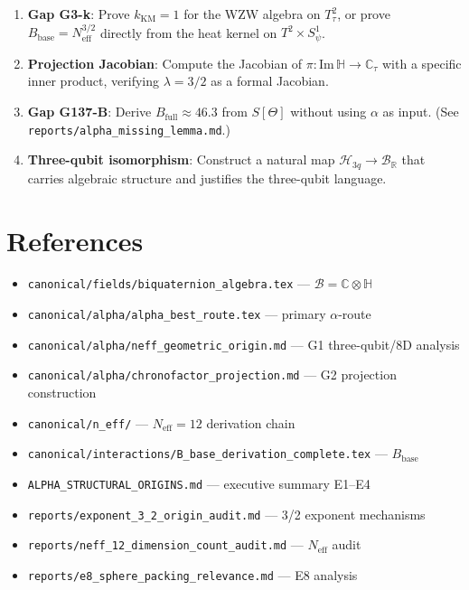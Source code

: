 \documentclass[12pt,a4paper]{article}
\theoremstyle{definition}
\theoremstyle{remark}
\begin{document}
\begin{enumerate}
  \item \textbf{Gap G3-k}: Prove $k_\mathrm{KM} = 1$ for the WZW algebra on $T^2_\tau$,
        or prove $B_\mathrm{base} = N_\mathrm{eff}^{3/2}$ directly from the heat kernel
        on $T^2 \times S^1_\psi$.

  \item \textbf{Projection Jacobian}: Compute the Jacobian of
        $\pi: \mathrm{Im}\,\mathbb{H} \to \mathbb{C}_\tau$ with a specific inner product,
        verifying $\lambda = 3/2$ as a formal Jacobian.

  \item \textbf{Gap G137-B}: Derive $B_\mathrm{full} \approx 46.3$ from $S[\Theta]$
        without using $\alpha$ as input.  (See \texttt{reports/alpha\_missing\_lemma.md}.)

  \item \textbf{Three-qubit isomorphism}: Construct a natural map
        $\mathcal{H}_{3q} \to \mathcal{B}_\mathbb{R}$ that carries algebraic structure
        and justifies the three-qubit language.
\end{enumerate}

\section{References}
\label{sec:g5:refs}

\begin{itemize}
  \item \texttt{canonical/fields/biquaternion\_algebra.tex} — $\mathcal{B} = \mathbb{C}\otimes\mathbb{H}$
  \item \texttt{canonical/alpha/alpha\_best\_route.tex} — primary $\alpha$-route
  \item \texttt{canonical/alpha/neff\_geometric\_origin.md} — G1 three-qubit/8D analysis
  \item \texttt{canonical/alpha/chronofactor\_projection.md} — G2 projection construction
  \item \texttt{canonical/n\_eff/} — $N_\mathrm{eff} = 12$ derivation chain
  \item \texttt{canonical/interactions/B\_base\_derivation\_complete.tex} — $B_\mathrm{base}$
  \item \texttt{ALPHA\_STRUCTURAL\_ORIGINS.md} — executive summary E1--E4
  \item \texttt{reports/exponent\_3\_2\_origin\_audit.md} — 3/2 exponent mechanisms
  \item \texttt{reports/neff\_12\_dimension\_count\_audit.md} — $N_\mathrm{eff}$ audit
  \item \texttt{reports/e8\_sphere\_packing\_relevance.md} — E8 analysis
\end{itemize}

\ifdefined\INCLUDEMODE
\else
  
\end{document}
